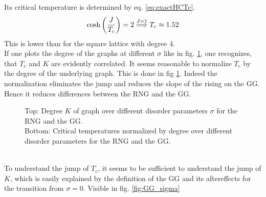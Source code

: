     Its critical temperature is determined by eq. \eqref{eq:exactHCTc}.
    \begin{equation}
        \cosh\left(\frac{J}{T_c}\right)=2 \overset{J=1}{\Longrightarrow} T_c \approx 1.52
        \label{eq:exactHCTc}
    \end{equation}
    This is lower than for the square lattice with degree 4.\\
    If one plots the degree of the graphs at different \(\sigma\) like
    in fig. \ref{fig:Tc_deg},
    one recognizes, that \(T_c\) and \(K\) are evidently correlated.
    It seems reasonable to normalize \(T_c\) by the degree of the underlying
    graph. This is done in fig \ref{fig:Tc_deg}.
    Indeed the normalization eliminates the jump and reduces the
    slope of the rising on the GG. Hence it reduces differences
    between the RNG and the GG.
    \begin{figure}[htbp]
        \centering


        \caption[Critical Temperature Normalized by Degree of the Graph]
        {
            Top: Degree \(K\) of graph over different
            disorder parameters \(\sigma\) for
             the RNG and
             the GG.\\
            Bottom: Critical temperatures normalized by degree over different
            disorder parameters for
             the RNG and
             the GG.
        }
        \label{fig:Tc_deg}
    \end{figure}\\
    To understand the jump of \(T_c\), it seems to be sufficient to
    understand the jump of \(K\), which is easily explained
    by the definition of the GG and its aftereffects for
    the transition from \(\sigma = 0\). Visible in fig. \ref{fig:GG_sigma}
